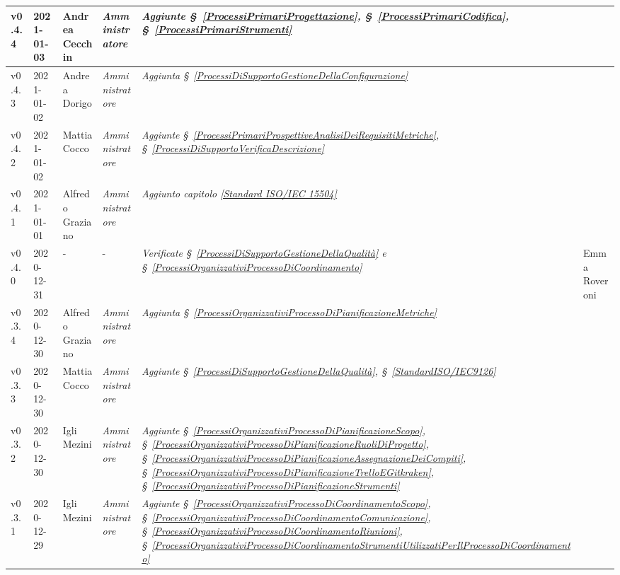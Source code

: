 {\begin{center}
\begin{longtable}[c]{|p{2cm-1\tabcolsep}|p{2cm}|p{3cm-2\tabcolsep}|p{3cm-1.5\tabcolsep}|p{}|p{3cm-2\tabcolsep}|}
		\hline
		\centering v0.4.4 & 2021-01-03 & Andrea Cecchin & \centering \textit{Amministratore} &  \textit{Aggiunte  \S~\ref{ProcessiPrimariProgettazione}, \S~\ref{ProcessiPrimariCodifica}, \S~\ref{ProcessiPrimariStrumenti}}  & \makecell[c]{-}\\
		\hline
		\centering v0.4.3 & 2021-01-02 & Andrea Dorigo & \centering \textit{Amministratore}  & \textit{Aggiunta  \S~\ref{ProcessiDiSupportoGestioneDellaConfigurazione}} & \makecell[c]{-}\\
		\hline
		\centering v0.4.2 & 2021-01-02 & Mattia Cocco & \centering \textit{Amministratore}  & \textit{Aggiunte  \S~\ref{ProcessiPrimariProspettiveAnalisiDeiRequisitiMetriche}, \S~\ref{ProcessiDiSupportoVerificaDescrizione}}  & \makecell[c]{-}\\
		\hline
		\centering v0.4.1 & 2021-01-01 & Alfredo Graziano & \centering \textit{Amministratore}  & \textit{Aggiunto capitolo \ref{Standard ISO/IEC 15504}} &\makecell[c]{-} \\
		\hline
		\centering v0.4.0 & 2020-12-31 & \centering - & \centering -  & \textit{Verificate  \S~\ref{ProcessiDiSupportoGestioneDellaQualità} e \S~\ref{ProcessiOrganizzativiProcessoDiCoordinamento} } & Emma Roveroni \\
		\hline
		\centering v0.3.4 & 2020-12-30 & Alfredo Graziano & \centering \textit{Amministratore} &  \textit{Aggiunta  \S~\ref{ProcessiOrganizzativiProcessoDiPianificazioneMetriche}} & \makecell[c]{-} \\
		\hline
		\centering v0.3.3 & 2020-12-30 & Mattia Cocco & \centering \textit{Amministratore}  & \textit{Aggiunte  \S~\ref{ProcessiDiSupportoGestioneDellaQualità}, \S~\ref{StandardISO/IEC9126} }  & \makecell[c]{-}\\
		\hline
		\centering v0.3.2 & 2020-12-30 & Igli Mezini & \centering \textit{Amministratore}  & \textit{Aggiunte  \S~\ref{ProcessiOrganizzativiProcessoDiPianificazioneScopo}, \S~\ref{ProcessiOrganizzativiProcessoDiPianificazioneRuoliDiProgetto}, \S~\ref{ProcessiOrganizzativiProcessoDiPianificazioneAssegnazioneDeiCompiti}, \S~\ref{ProcessiOrganizzativiProcessoDiPianificazioneTrelloEGitkraken}, \S~\ref{ProcessiOrganizzativiProcessoDiPianificazioneStrumenti} } & \makecell[c]{-} \\
		\hline
		\centering v0.3.1 & 2020-12-29 & Igli Mezini & \centering \textit{Amministratore} &  \textit{Aggiunte  \S~\ref{ProcessiOrganizzativiProcessoDiCoordinamentoScopo}, \S~\ref{ProcessiOrganizzativiProcessoDiCoordinamentoComunicazione}, \S~\ref{ProcessiOrganizzativiProcessoDiCoordinamentoRiunioni}, \S~\ref{ProcessiOrganizzativiProcessoDiCoordinamentoStrumentiUtilizzatiPerIlProcessoDiCoordinamento} } & \makecell[c]{-} \\

\end{longtable}
\end{center}}
